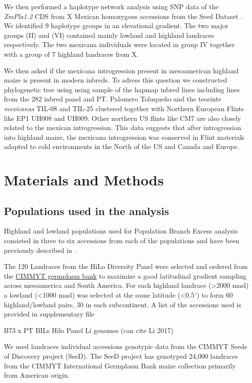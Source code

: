 \documentclass[9pt,twocolumn,twoside,lineno]{gsajnl}
\begin{document}
We then performed a haplotype network analysis using SNP data of the \textit{ZmPla1.2} CDS from X Mexican homozygous accessions from the Seed Dataset \cite{Romero_Navarro2017-cn}. We identified 9 haplotype groups in an elevational gradient. The two major groups (II) and (VI) contained mainly lowland and highland landraces respectively. The two mexicana individuals were located in group IV together with a group of 7 highland landraces from X. 

We then asked if the mexicana introgression present in mesoamerican highland maize is present in modern inbreds. To adress this question we constructed phylogenetic tree using using sample of the hapmap inbred lines including lines from the 282 inbred panel and PT. Palomero Toluqueño and the teosinte \textit{mexicanas} TIL-08 and TIL-25 clustered together with Northern European Flints like EP1 UH008 and UH009. Other northern US flints like CM7 are also closely related to the mexican introgression. This data suggests that after introgression into highland maize, the mexicana introgression was conserved in Flint materials adapted to cold environments in the North of the US and Canada and Europe. 

\section{Materials and Methods}
\label{sec:materials:methods}

\subsection{Populations used in the analysis } 
Highland and lowland populations used for Population Branch Excess analysis consisted in three to six accessions from each of the populations and have been previously described in \cite{Wang2020-mp, Wang2017-bc}. 


The 120 Landraces from the HiLo Diversity Panel were selected and ordered from the \href{http://mgb.cimmyt.org/gringlobal/search.aspx}{CIMMYT germplasm bank} to maximize a good latitudinal gradient sampling across mesoamerica and South America. For each highland landrace (>2000 masl) a lowland (<1000 masl) was selected at the same latitude (<0.5$^{\circ}$) to form 60 highland/lowland pairs, 30 in each subcontinent. A list of the accessions used is provided in supplementary file  


B73 x PT BILs
Hilo Panel
Li genomes (can cite Li 2017)

We used landraces individual accessions genotypic data from the CIMMYT Seeds of Discovery project (SeeD). The SeeD project has genotyped 24,000 landraces from the  CIMMYT International Germplasm Bank maize collection primarily from American origin.
\end{document}
